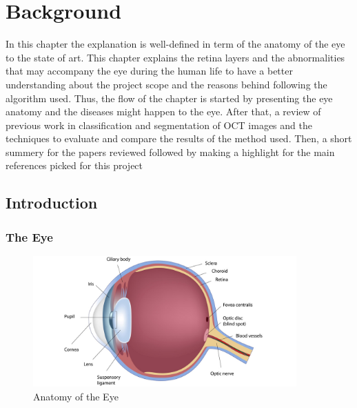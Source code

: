 \chapter{Background} \label{chap:background}

In this chapter the explanation is well-defined in term of the anatomy of the eye to the state of art.
This chapter explains the retina layers and the abnormalities that may accompany the eye during the human life to have a better understanding about the project scope and the reasons behind following the algorithm used.
Thus, the flow of the chapter is started by presenting the eye anatomy and the diseases might happen to the eye.
After that, a review of previous work in classification and segmentation of OCT images and the techniques to evaluate and compare the results of the method used.
Then, a short summery for the papers reviewed followed by making a highlight for the main references picked for this project   

\section{Introduction}

\subsection{The Eye}

\begin{figure}[htb]
        \centering
        \includegraphics[width = 0.9\textwidth]{figures/Eye_anatomy.jpg} %
  \caption{Anatomy of the Eye \cite{eyeimage}}
  \label{fig:Eyeanatomy}
\end{figure}  

